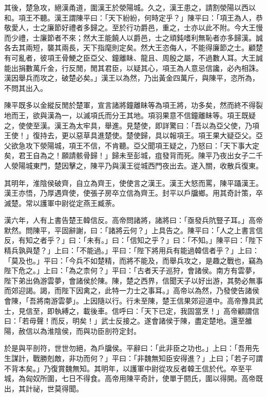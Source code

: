 \begin{pinyinscope}
其後，楚急攻，絕漢甬道，圍漢王於滎陽城。久之，漢王患之，請割滎陽以西以和。項王不聽。漢王謂陳平曰：「天下紛紛，何時定乎？」陳平曰：「項王為人，恭敬愛人，士之廉節好禮者多歸之。至於行功爵邑，重之，士亦以此不附。今大王慢而少禮，士廉節者不來；然大王能饒人以爵邑，士之頑鈍嗜利無恥者亦多歸漢。誠各去其兩短，襲其兩長，天下指麾則定矣。然大王恣侮人，不能得廉節之士。顧楚有可亂者，彼項王骨鯁之臣亞父、鐘離眛、龍且、周殷之屬，不過數人耳。大王誠能出捐數萬斤金，行反閒，閒其君臣，以疑其心，項王為人意忌信讒，必內相誅。漢因舉兵而攻之，破楚必矣。」漢王以為然，乃出黃金四萬斤，與陳平，恣所為，不問其出入。

陳平既多以金縱反閒於楚軍，宣言諸將鐘離眛等為項王將，功多矣，然而終不得裂地而王，欲與漢為一，以滅項氏而分王其地。項羽果意不信鐘離眛等。項王既疑之，使使至漢。漢王為太牢具，舉進。見楚使，即詳驚曰：「吾以為亞父使，乃項王使！」復持去，更以惡草具進楚使。楚使歸，具以報項王。項王果大疑亞父。亞父欲急攻下滎陽城，項王不信，不肯聽。亞父聞項王疑之，乃怒曰：「天下事大定矣，君王自為之！願請骸骨歸！」歸未至彭城，疽發背而死。陳平乃夜出女子二千人滎陽城東門，楚因擊之，陳平乃與漢王從城西門夜出去。遂入關，收散兵復東。

其明年，淮陰侯破齊，自立為齊王，使使言之漢王。漢王大怒而罵，陳平躡漢王。漢王亦悟，乃厚遇齊使，使張子房卒立信為齊王。封平以戶牖鄉。用其奇計策，卒滅楚。常以護軍中尉從定燕王臧荼。

漢六年，人有上書告楚王韓信反。高帝問諸將，諸將曰：「亟發兵阬豎子耳。」高帝默然。問陳平，平固辭謝，曰：「諸將云何？」上具告之。陳平曰：「人之上書言信反，有知之者乎？」曰：「未有。」曰：「信知之乎？」曰：「不知。」陳平曰：「陛下精兵孰與楚？」上曰：「不能過。」平曰：「陛下將用兵有能過韓信者乎？」上曰：「莫及也。」平曰：「今兵不如楚精，而將不能及，而舉兵攻之，是趣之戰也，竊為陛下危之。」上曰：「為之柰何？」平曰：「古者天子巡狩，會諸侯。南方有雲夢，陛下弟出偽游雲夢，會諸侯於陳。陳，楚之西界，信聞天子以好出游，其勢必無事而郊迎謁。謁，而陛下因禽之，此特一力士之事耳。」高帝以為然，乃發使告諸侯會陳，「吾將南游雲夢」。上因隨以行。行未至陳，楚王信果郊迎道中。高帝豫具武士，見信至，即執縛之，載後車。信呼曰：「天下已定，我固當烹！」高帝顧謂信曰：「若毋聲！而反，明矣！」武士反接之。遂會諸侯于陳，盡定楚地。還至雒陽，赦信以為淮陰侯，而與功臣剖符定封。

於是與平剖符，世世勿絕，為戶牖侯。平辭曰：「此非臣之功也。」上曰：「吾用先生謀計，戰勝剋敵，非功而何？」平曰：「非魏無知臣安得進？」上曰；「若子可謂不背本矣。」乃復賞魏無知。其明年，以護軍中尉從攻反者韓王信於代。卒至平城，為匈奴所圍，七日不得食。高帝用陳平奇計，使單于閼氏，圍以得開。高帝既出，其計祕，世莫得聞。


\end{pinyinscope}
